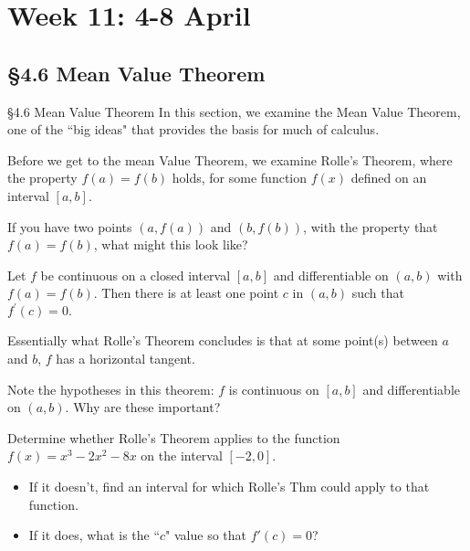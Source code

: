 \documentclass[cal1spr16Lectures.tex]{subfiles}
\begin{document}
\section[Week 11]{Week 11: 4-8 April}

\subsection[4.6 Mean Value Theorem]{\S 4.6 Mean Value Theorem}

\begin{frame}{\S 4.6 Mean Value Theorem}\small
In this section, we examine the Mean Value Theorem, one of the ``big ideas" that provides the basis for much of calculus.  

\vspace{0.5pc}
Before we get to the mean Value Theorem, we examine Rolle's Theorem, where the property $f(a)=f(b)$ holds, for some function $f(x)$ defined on an interval $[a,b]$.

\begin{que}
If you have two points $(a,f(a))$ and $(b,f(b))$, with the property that $f(a)=f(b)$, what might this look like?
\end{que}
\end{frame}

\begin{frame}\small 
\begin{thm}  
Let $f$ be continuous on a closed interval $[a,b]$ and differentiable on $(a,b)$ with $f(a)=f(b)$.  Then there is at least one point $c$ in $(a,b)$ such that $f^{\prime}(c)=0.$ 
\end{thm}
Essentially what Rolle's Theorem concludes is that at some point(s) between $a$ and $b$, $f$ has a horizontal tangent.
\begin{que}
Note the hypotheses in this theorem: $f$ is continuous on $[a,b]$ and differentiable on $(a,b)$.  Why are these important?
\end{que}
\end{frame}

\begin{frame}
\begin{exe}
Determine whether Rolle's Theorem applies to the function $f(x)=x^3-2x^2-8x$ on the interval $[-2,0]$.
\begin{itemize}
\item If it doesn't, find an interval for which Rolle's Thm could apply to that function.
\item If it does, what is the ``$c$" value so that $f'(c)=0$?  
\end{itemize}
\end{exe}
\end{frame}
\end{document}
